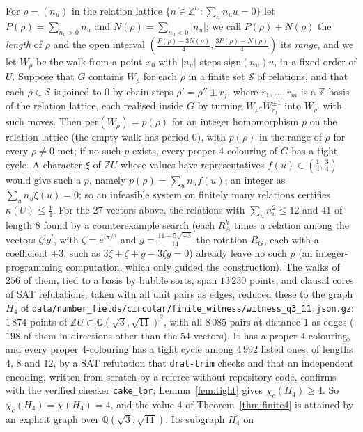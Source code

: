 \documentclass[11pt,a4paper]{amsart}
\theoremstyle{remark}
\newcommand{\Q}{\mathbb{Q}}
\newcommand{\Z}{\mathbb{Z}}
\begin{document}
For $\rho=(n_u)$ in the relation lattice $\{n\in\Z^U:\sum_un_uu=0\}$ let $P(\rho)=\sum_{n_u>0}n_u$ and
$N(\rho)=\sum_{n_u<0}|n_u|$; we call $P(\rho)+N(\rho)$ the \emph{length} of $\rho$ and the open interval
$(\frac{P(\rho)-3N(\rho)}4,\frac{3P(\rho)-N(\rho)}4)$ its \emph{range}, and we let $W_\rho$ be the walk from a point
$x_0$ with $|n_u|$ steps $\mathrm{sign}(n_u)u$, in a fixed order of $U$. Suppose that $G$ contains $W_\rho$ for each
$\rho$ in a finite set $\mathcal S$ of relations, and that each $\rho\in\mathcal S$ is joined to $0$ by chain steps
$\rho'=\rho''\pm r_j$, where $r_1,\dots,r_m$ is a $\Z$-basis of the relation lattice, each realised inside $G$ by
turning $W_{\rho''}W_{r_j}^{\pm1}$ into $W_{\rho'}$ with such moves. Then $\mathrm{per}(W_\rho)=p(\rho)$ for an
integer homomorphism $p$ on the relation lattice (the empty walk has period $0$), with $p(\rho)$ in the range of
$\rho$ for every $\rho\ne0$ met; if no such $p$ exists, every proper $4$-colouring of $G$ has a tight cycle. A
character $\xi$ of $\Z U$ whose values have representatives $f(u)\in(\frac14,\frac34)$ would give such a $p$, namely
$p(\rho)=\sum_un_uf(u)$, an integer as $\sum_un_u\xi(u)=0$; so an infeasible system on finitely many relations
certifies $\kappa(U)\le\frac14$. For the $27$ vectors above, the relations with $\sum_un_u^2\le12$ and $41$ of length
$8$ found by a counterexample search (each $R_A^k$ times a relation among the vectors $\zeta^jg^l$, with
$\zeta=e^{i\pi/3}$ and $g=\frac{11+5\sqrt{-3}}{14}$ the rotation $R_G$, each with a coefficient $\pm3$, such as
$3\bar\zeta+\zeta+g-3\bar\zeta g=0$) already leave no such $p$ (an integer-programming computation, which only guided
the construction). The walks of $256$ of them, tied to a basis by bubble sorts, span $13\,230$ points, and clausal
cores of SAT refutations, taken with all unit pairs as edges, reduced these to the graph $H_4$ of
\nolinkurl{data/number_fields/circular/finite_witness/witness_q3_11.json.gz}: $1\,874$ points of $\Z U\subset
\Q(\sqrt3,\sqrt{11})^2$, with all $8\,085$ pairs at distance $1$ as edges ($198$ of them in directions other than the
$54$ vectors). It has a proper $4$-colouring, and every proper $4$-colouring has a tight cycle among $4\,992$ listed
ones, of lengths $4$, $8$ and $12$, by a SAT refutation that \texttt{drat-trim} checks and that an independent
encoding, written from scratch by a referee without repository code, confirms with the verified checker
\texttt{cake\_lpr}; Lemma~\ref{lem:tight} gives $\chi_c(H_4)\ge4$. So $\chi_c(H_4)=\chi(H_4)=4$, and the value $4$ of
Theorem~\ref{thm:finite4} is attained by an explicit graph over $\Q(\sqrt3,\sqrt{11})$. Its subgraph $H_4^\circ$ on
\end{document}
